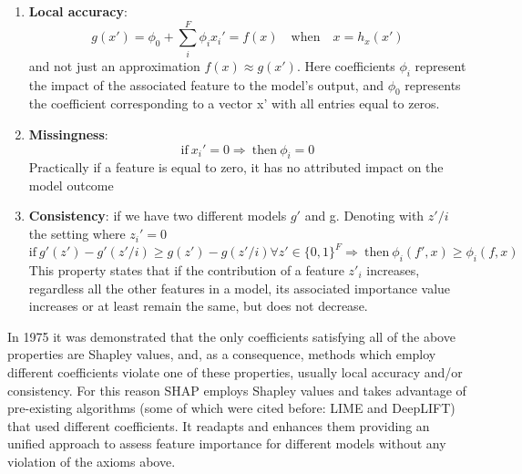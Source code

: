 \documentclass[11pt]{report}
\begin{document}
\begin{enumerate}
\item \textbf{Local accuracy}:
\begin{equation}
g(x') =\phi_0 + \sum_i^F \phi_i x_i' \mathbf{=} f(x) \quad \text{when} \quad x = h_x(x')
\end{equation} and not just an approximation $f(x) \approx g(x')$. Here coefficients $\phi_i$ represent the impact of the associated feature to the model's output, and $\phi_0$ represents the coefficient corresponding to a vector x' with all entries equal to zeros.
\item \textbf{Missingness}:
\begin{equation}
\text{if} \ x_i' = 0 \Longrightarrow \ \text{then} \ \phi_i = 0
\end{equation}
Practically if a feature is equal to zero, it has no attributed impact on the model outcome
\item \textbf{Consistency}: if we have two different models $g'$ and g. Denoting with $z' / i$ the setting where $z_i' = 0$
\begin{equation}
\text{if} \ g'(z') - g'(z' / i) \ge g(z') - g(z' / i) \forall z' \in \{0, 1\}^F \Longrightarrow \ \text{then} \ \phi_i(f', x) \ge \phi_i(f, x)
\end{equation}
This property states that if the contribution of a feature $z'_i$ increases, regardless all the other features in a model, its associated importance value increases or at least remain the same, but does not decrease.
\end{enumerate}

In 1975 it was demonstrated \cite{young1985} that the only coefficients satisfying all of the above properties are Shapley values, and, as a consequence, methods which employ different coefficients violate one of these properties, usually local accuracy and/or consistency.
For this reason SHAP employs Shapley values and takes advantage of pre-existing algorithms (some of which were cited before: LIME and DeepLIFT) that used different coefficients.
It readapts and enhances them providing an unified approach to assess feature importance for different models without any violation of the axioms above.
\end{document}
